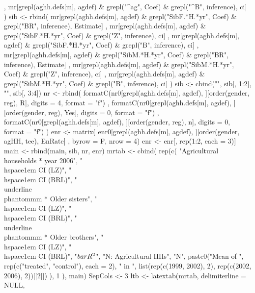 \begin{Schunk}
\begin{Sinput}
{{{        ,
        mr[grepl(aghh.defs[m], agdef) & grepl("^ag", Coef) & grepl("^B", inference), ci]
      )
      sib <-  rbind(
         mr[grepl(aghh.defs[m], agdef)  & grepl("SibF.*H.*yr", Coef) & grepl("BR", inference), Estimate]
         , 
         mr[grepl(aghh.defs[m], agdef) & grepl("SibF.*H.*yr", Coef) & grepl("Z", inference), ci]
         ,
         mr[grepl(aghh.defs[m], agdef) & grepl("SibF.*H.*yr", Coef) & grepl("B", inference), ci]
         ,
         mr[grepl(aghh.defs[m], agdef) & grepl("SibM.*H.*yr", Coef) & grepl("BR", inference), Estimate]
         , 
         mr[grepl(aghh.defs[m], agdef) & grepl("SibM.*H.*yr", Coef) & grepl("Z", inference), ci]
         ,
         mr[grepl(aghh.defs[m], agdef) & grepl("SibM.*H.*yr", Coef) & grepl("B", inference), ci]
      )
      sib <- cbind("", sib[, 1:2], "", sib[, 3:4])
      nr <- rbind(
          formatC(nr0[grepl(aghh.defs[m], agdef), ][order(gender, reg), R], digits = 4, format = "f")
        , formatC(nr0[grepl(aghh.defs[m], agdef), ][order(gender, reg), Yes], digits = 0, format = "f")
        , formatC(nr0[grepl(aghh.defs[m], agdef), ][order(gender, reg), n], digits = 0, format = "f")
      )
      enr <- matrix(
         enr0[grepl(aghh.defs[m], agdef), ][order(gender, agHH, tee), EnRate]
         , byrow = F, nrow = 4)
      enr <- enr[, rep(1:2, each = 3)]
      main <- rbind(main, sib, nr, enr)
      mrtab <- 
         cbind(
             rep(c(
               "Agricultural households * year 2006", 
               "\\hspace{1em} CI (LZ)", "\\hspace{1em} CI (BRL)", 
               "\\underline{\\phantom{mm}} * Older sisters",
               "\\hspace{1em} CI (LZ)", "\\hspace{1em} CI (BRL)", 
               "\\underline{\\phantom{mm}} * Older brothers",
               "\\hspace{1em} CI (LZ)", "\\hspace{1em} CI (BRL)", 
               "$\\bar{R}^{2}$", "N: Agricultural HHs", "N",
               paste0("Mean of ", rep(c("treated", "control"), each = 2), " in ", 
                 list(rep(c(1999, 2002), 2), rep(c(2002, 2006), 2))[[2]])
                ), 1
             ), 
          main)
      SepCols <- 3
      ltb <- latextab(mrtab, delimiterline = NULL, 
}}}
\end{Sinput}
\end{Schunk}
